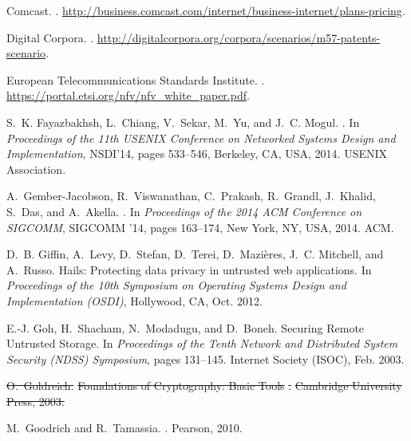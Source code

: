 \documentclass[letterpaper,twocolumn,10pt]{article}
\providecommand{\DIFdeltex}[1]{{\protect\color{red}\sout{#1}}}                      %
\providecommand{\DIFdelbegin}{} %
\providecommand{\DIFdelend}{} %
\providecommand{\DIFdel}[1]{\texorpdfstring{\DIFdeltex{#1}}{}} %
\begin{document}
{\begin{thebibliography}{10}
{Comcast}.
.
\newblock
  \url{http://business.comcast.com/internet/business-internet/plans-pricing}.

{Digital Corpora}.
.
\newblock
  \url{http://digitalcorpora.org/corpora/scenarios/m57-patents-scenario}.

{European Telecommunications Standards Institute}.
.
\newblock \url{https://portal.etsi.org/nfv/nfv_white_paper.pdf}.

S.~K. Fayazbakhsh, L.~Chiang, V.~Sekar, M.~Yu, and J.~C. Mogul.
.
\newblock In {\em Proceedings of the 11th {USENIX} Conference on Networked
  Systems Design and Implementation}, {NSDI}'14, pages 533--546, Berkeley,
  {CA}, {USA}, 2014. {USENIX} Association.

A.~Gember-Jacobson, R.~Viswanathan, C.~Prakash, R.~Grandl, J.~Khalid, S.~Das,
  and A.~Akella.
.
\newblock In {\em Proceedings of the 2014 {ACM} Conference on {SIGCOMM}},
  {SIGCOMM} '14, pages 163--174, New York, {NY}, {USA}, 2014. {ACM}.

D.~B. Giffin, A.~Levy, D.~Stefan, D.~Terei, D.~Mazi{\`e}res, J.~C. Mitchell,
  and A.~Russo.
\newblock Hails: Protecting data privacy in untrusted web applications.
\newblock In {\em Proceedings of the 10th Symposium on Operating Systems Design
  and Implementation ({OSDI})}, Hollywood, CA, Oct. 2012.

E.-J. Goh, H.~Shacham, N.~Modadugu, and D.~Boneh.
 {S}ecuring {R}emote {U}ntrusted {S}torage.
\newblock In {\em Proceedings of the Tenth Network and Distributed System
  Security (NDSS) Symposium}, pages 131--145. Internet Society (ISOC), Feb.
  2003.

\DIFdelbegin %
\DIFdel{O.~Goldreich.
}%
\DIFdel{Foundations of Cryptography: Basic Tools}%
\DIFdel{.
}%
\DIFdel{Cambridge University Press, 2003.
}%

\DIFdelend {}
M.~Goodrich and R.~Tamassia.
.
\newblock Pearson, 2010.


\end{thebibliography}}
\end{document}
